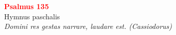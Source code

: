 


\def\greinitialformat#1{%
{\fontsize{39}{39}\selectfont #1}%
}




\vspace{0.3cm}
\begin{center}
 \textcolor{red}{\large \bf Psalmus 135}\\
Hymnus paschalis\\
\textit{\small Domini res gestas narrare, laudare est. (Cassiodorus)}
\end{center}
